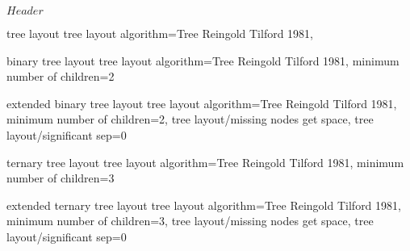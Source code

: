 %
%
%

\ProvidesFileRCS[v\pgfversion] $Header$




%
%

%
%
% 
% 






%
%
\pgfgddeclarealgorithmkey
  {tree layout}
  {tree layout}
  {
    algorithm=Tree Reingold Tilford 1981,
  }

%
%
\pgfgddeclarealgorithmkey
  {binary tree layout}
  {tree layout}
  {
    algorithm=Tree Reingold Tilford 1981,
    minimum number of children=2
  }

%
%
\pgfgddeclarealgorithmkey
  {extended binary tree layout}
  {tree layout}
  {
    algorithm=Tree Reingold Tilford 1981,
    minimum number of children=2,
    tree layout/missing nodes get space,
    tree layout/significant sep=0
  }

%
%
\pgfgddeclarealgorithmkey
  {ternary tree layout}
  {tree layout}
  {
    algorithm=Tree Reingold Tilford 1981,
    minimum number of children=3
  }

%
%
\pgfgddeclarealgorithmkey
  {extended ternary tree layout}
  {tree layout}
  {
    algorithm=Tree Reingold Tilford 1981,
    minimum number of children=3,
    tree layout/missing nodes get space,
    tree layout/significant sep=0
  }





\endinput
